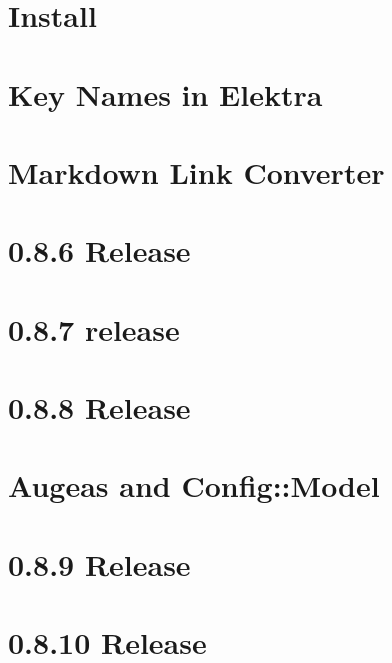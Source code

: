 \let\mypdfximage\pdfximage\def\pdfximage{\immediate\mypdfximage}\documentclass[twoside]{book}
\newcommand{\+}{\discretionary{\mbox{\scriptsize$\hookleftarrow$}}{}{}}
\begin{document}
\chapter{Install}
\label{doc_INSTALL_md}

\chapter{Key Names in Elektra}
\label{doc_KEYNAMES_md}

\chapter{Markdown Link Converter}
\label{doc_markdownlinkconverter_README_md}

\chapter{0.8.6 Release}
\label{doc_news_2014-06-21_0_8_6_md}

\chapter{0.8.7 release}
\label{doc_news_2014-07-28_0_8_7_md}

\chapter{0.8.8 Release}
\label{doc_news_2014-09-02_0_8_8_md}

\chapter{Augeas and Config\+::Model}
\label{doc_news_2014-10-22_augeas_md}

\chapter{0.8.9 Release}
\label{doc_news_2014-11-04_0_8_9_md}

\chapter{0.8.10 Release}
\label{doc_news_2014-12-02_0_8_10_md}

\end{document}
